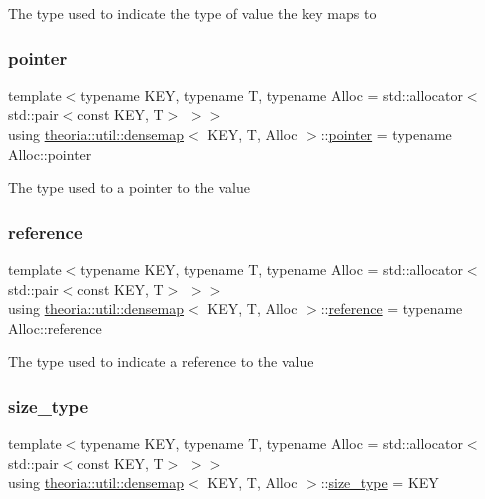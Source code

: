 The type used to indicate the type of value the key maps to \mbox{\label{classtheoria_1_1util_1_1densemap_ae892a1fc35162971bb0278c7904995c6}} 
\subsubsection{\texorpdfstring{pointer}{pointer}}
{\footnotesize\ttfamily template$<$typename K\+EY, typename T, typename Alloc = std\+::allocator$<$std\+::pair$<$const K\+E\+Y, T$>$ $>$$>$ \\
using \hyperlink{classtheoria_1_1util_1_1densemap}{theoria\+::util\+::densemap}$<$ K\+EY, T, Alloc $>$\+::\hyperlink{classtheoria_1_1util_1_1densemap_ae892a1fc35162971bb0278c7904995c6}{pointer} =  typename Alloc\+::pointer}

The type used to a pointer to the value \mbox{\label{classtheoria_1_1util_1_1densemap_a20361bfcacef17947099d8580befbbdc}} 
\subsubsection{\texorpdfstring{reference}{reference}}
{\footnotesize\ttfamily template$<$typename K\+EY, typename T, typename Alloc = std\+::allocator$<$std\+::pair$<$const K\+E\+Y, T$>$ $>$$>$ \\
using \hyperlink{classtheoria_1_1util_1_1densemap}{theoria\+::util\+::densemap}$<$ K\+EY, T, Alloc $>$\+::\hyperlink{classtheoria_1_1util_1_1densemap_a20361bfcacef17947099d8580befbbdc}{reference} =  typename Alloc\+::reference}

The type used to indicate a reference to the value \mbox{\label{classtheoria_1_1util_1_1densemap_a133075e61db44e086c734c8a32ca6ab2}} 
\subsubsection{\texorpdfstring{size\+\_\+type}{size\_type}}
{\footnotesize\ttfamily template$<$typename K\+EY, typename T, typename Alloc = std\+::allocator$<$std\+::pair$<$const K\+E\+Y, T$>$ $>$$>$ \\
using \hyperlink{classtheoria_1_1util_1_1densemap}{theoria\+::util\+::densemap}$<$ K\+EY, T, Alloc $>$\+::\hyperlink{classtheoria_1_1util_1_1densemap_a133075e61db44e086c734c8a32ca6ab2}{size\+\_\+type} =  K\+EY}

